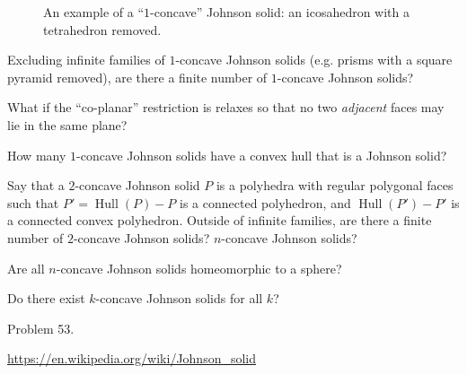 \documentclass{article}
\begin{document}
\begin{figure}[ht!]
  \caption{An example of a ``$1$-concave'' Johnson solid: an icosahedron with a tetrahedron removed.}
\end{figure}

\begin{question}
  Excluding infinite families of $1$-concave Johnson solids
  (e.g. prisms with a square pyramid removed),
  are there a finite number of $1$-concave Johnson solids?
\end{question}

\begin{related}
  \item What if the ``co-planar'' restriction is relaxes so that no two
    \textit{adjacent} faces may lie in the same plane?
  \item How many $1$-concave Johnson solids have a convex hull that is a
    Johnson solid?
  \item Say that a $2$-concave Johnson solid $P$ is a polyhedra with regular
    polygonal faces such that
    $P' = \operatorname{Hull}(P) - P$ is a connected polyhedron, and
    $\operatorname{Hull}(P') - P'$ is a connected convex polyhedron.
    Outside of infinite families,
    are there a finite number of $2$-concave Johnson solids?
    $n$-concave Johnson solids?
  \item Are all $n$-concave Johnson solids homeomorphic to a sphere?
  \item Do there exist $k$-concave Johnson solids for all $k$?
\end{related}

\begin{references}
  \item Problem 53.
  \item \url{https://en.wikipedia.org/wiki/Johnson_solid}
\end{references}
\end{document}
